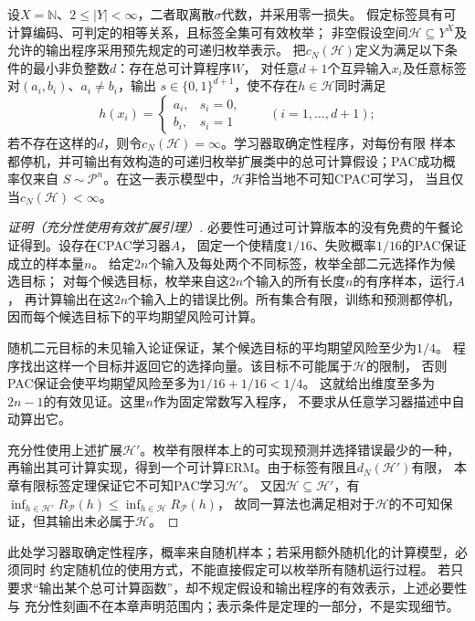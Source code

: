 \begin{theorem}[有限标签的非恰当CPAC刻画]
\label{thm:computable-multiclass-characterization}
设$X=\mathbb N$、$2\leq|Y|<\infty$，二者取离散$\sigma$代数，并采用零一损失。
假定标签具有可计算编码、可判定的相等关系，且标签全集可有效枚举；
非空假设空间$\mathcal H\subseteq Y^X$及允许的输出程序采用预先规定的可递归枚举表示。
把$c_N(\mathcal H)$定义为满足以下条件的最小非负整数$d$：存在总可计算程序$W$，
对任意$d+1$个互异输入$x_i$及任意标签对$(a_i,b_i)$、$a_i\neq b_i$，输出
$s\in\{0,1\}^{d+1}$，使不存在$h\in\mathcal H$同时满足
\[
 h(x_i)=\begin{cases}a_i,&s_i=0,\\b_i,&s_i=1\end{cases}
 \qquad(i=1,\ldots,d+1);
\]
若不存在这样的$d$，则令$c_N(\mathcal H)=\infty$。学习器取确定性程序，对每份有限
样本都停机，并可输出有效构造的可递归枚举扩展类中的总可计算假设；PAC成功概率仅来自
$S\sim\mathcal P^n$。在这一表示模型中，$\mathcal H$非恰当地不可知CPAC可学习，
当且仅当$c_N(\mathcal H)<\infty$。
\end{theorem}
\begin{proof}[证明（充分性使用有效扩展引理）]
必要性可通过可计算版本的没有免费的午餐论证得到。设存在CPAC学习器$A$，
固定一个使精度$1/16$、失败概率$1/16$的PAC保证成立的样本量$n$。
给定$2n$个输入及每处两个不同标签，枚举全部二元选择作为候选目标；
对每个候选目标，枚举来自这$2n$个输入的所有长度$n$的有序样本，运行$A$，
再计算输出在这$2n$个输入上的错误比例。所有集合有限，训练和预测都停机，
因而每个候选目标下的平均期望风险可计算。

随机二元目标的未见输入论证保证，某个候选目标的平均期望风险至少为$1/4$。
程序找出这样一个目标并返回它的选择向量。该目标不可能属于$\mathcal H$的限制，
否则PAC保证会使平均期望风险至多为$1/16+1/16<1/4$。
这就给出维度至多为$2n-1$的有效见证。这里$n$作为固定常数写入程序，
不要求从任意学习器描述中自动算出它。

充分性使用上述扩展$\mathcal H'$。枚举有限样本上的可实现预测并选择错误最少的一种，
再输出其可计算实现，得到一个可计算ERM。由于标签有限且$d_N(\mathcal H')$有限，
本章有限标签定理保证它不可知PAC学习$\mathcal H'$。
又因$\mathcal H\subseteq\mathcal H'$，有
$\inf_{h\in\mathcal H'}R_{\mathcal P}(h)\leq\inf_{h\in\mathcal H}R_{\mathcal P}(h)$，
故同一算法也满足相对于$\mathcal H$的不可知保证，但其输出未必属于$\mathcal H$。
\end{proof}

此处学习器取确定性程序，概率来自随机样本；若采用额外随机化的计算模型，必须同时
约定随机位的使用方式，不能直接假定可以枚举所有随机运行过程。
若只要求“输出某个总可计算函数”，却不规定假设和输出程序的有效表示，上述必要性与
充分性刻画不在本章声明范围内；表示条件是定理的一部分，不是实现细节。

